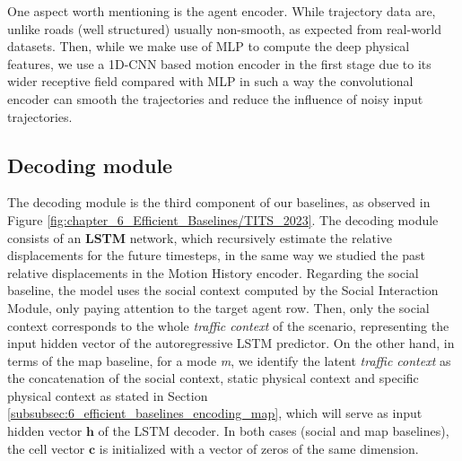 One aspect worth mentioning is the agent encoder. While trajectory data are, unlike roads (well structured) usually non-smooth, as expected from real-world datasets. Then, while we make use of MLP to compute the deep physical features, we use a 1D-CNN based motion encoder in the first stage due to its wider receptive field compared with MLP in such a way the convolutional encoder can smooth the trajectories and reduce the influence of noisy input trajectories.

\subsection{Decoding module}
\label{subsubsec:6_efficient_baselines_decoding_modules}

The decoding module is the third component of our baselines, as observed in Figure \ref{fig:chapter_6_Efficient_Baselines/TITS_2023}. The decoding module consists of an \textbf{LSTM} network, which recursively estimate the relative displacements for the future timesteps, in the same way we studied the past relative displacements in the Motion History encoder. Regarding the social baseline, the model uses the social context computed by the Social Interaction Module, only paying attention to the target agent row. Then, only the social context corresponds to the whole \textit{traffic context} of the scenario, representing the input hidden vector of the autoregressive LSTM predictor. On the other hand, in terms of the map baseline, for a mode \textit{m}, we identify the latent \textit{traffic context} as the concatenation of the social context, static physical context and specific physical context as stated in Section \ref{subsubsec:6_efficient_baselines_encoding_map}, which will serve as input hidden vector $\mathbf{h}$ of the LSTM decoder. In both cases (social and map baselines), the cell vector $\mathbf{c}$ is initialized with a vector of zeros of the same dimension. 

